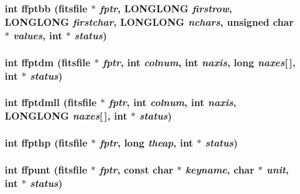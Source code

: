 \subsubsection{\setlength{\rightskip}{0pt plus 5cm}int ffptbb (\bf{fitsfile} $\ast$ {\em fptr}, \bf{LONGLONG} {\em firstrow}, \bf{LONGLONG} {\em firstchar}, \bf{LONGLONG} {\em nchars}, unsigned char $\ast$ {\em values}, int $\ast$ {\em status})}\label{src_2fitsio_8h_8154f91f7c90d22f49af94d61d443036}


\subsubsection{\setlength{\rightskip}{0pt plus 5cm}int ffptdm (\bf{fitsfile} $\ast$ {\em fptr}, int {\em colnum}, int {\em naxis}, long {\em naxes}[$\,$], int $\ast$ {\em status})}\label{src_2fitsio_8h_61fee5f0940f088541578184fae78ee2}


\subsubsection{\setlength{\rightskip}{0pt plus 5cm}int ffptdmll (\bf{fitsfile} $\ast$ {\em fptr}, int {\em colnum}, int {\em naxis}, \bf{LONGLONG} {\em naxes}[$\,$], int $\ast$ {\em status})}\label{src_2fitsio_8h_06197ea3bc9da99920d903dd807b11a9}


\subsubsection{\setlength{\rightskip}{0pt plus 5cm}int ffpthp (\bf{fitsfile} $\ast$ {\em fptr}, long {\em theap}, int $\ast$ {\em status})}\label{src_2fitsio_8h_d937788b718144227ca0e56f98b7d2ed}


\subsubsection{\setlength{\rightskip}{0pt plus 5cm}int ffpunt (\bf{fitsfile} $\ast$ {\em fptr}, const char $\ast$ {\em keyname}, char $\ast$ {\em unit}, int $\ast$ {\em status})}\label{src_2fitsio_8h_67dc8b0a8bbcf6abbd2b529763a4ea17}


